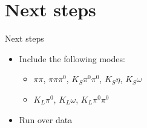 \documentclass{beamer}
\begin{document}
\section{Next steps}
\begin{frame}{Next steps}
  \begin{itemize}
    \item{Include the following modes:}
    \begin{itemize}
      \item{$\pi\pi$, $\pi\pi\pi^0$, $K_S\pi^0\pi^0$, $K_S\eta$, $K_S\omega$}
      \item{$K_L\pi^0$, $K_L\omega$, $K_L\pi^0\pi^0$}
    \end{itemize}
    \item{Run over data}
  \end{itemize}
\end{frame}
\end{document}
